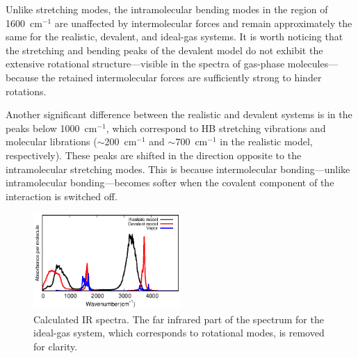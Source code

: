 \documentclass[journal=jacsat,manuscript=article]{achemso}
\begin{document}

Unlike stretching modes, the intramolecular bending modes in the region of 1600~cm$^{-1}$ are unaffected by intermolecular forces and remain approximately the same for the realistic, devalent, and ideal-gas systems. 
It is worth noticing that the stretching and bending peaks of the devalent model do not exhibit the extensive rotational structure---visible in the spectra of gas-phase molecules---because the retained intermolecular forces are sufficiently strong to hinder rotations.

Another significant difference between the realistic and devalent systems is in the peaks below 1000~cm$^{-1}$, which correspond to HB stretching vibrations and molecular librations ($\sim$200~cm$^{-1}$ and $\sim$700~cm$^{-1}$ in the realistic model, respectively). These peaks are shifted in the direction opposite to the intramolecular stretching modes. This is because intermolecular bonding---unlike intramolecular bonding---becomes softer when the covalent component of the interaction is switched off.%

\begin{figure}
\centering
\includegraphics[width=0.5\textwidth]{new_ir}
\caption{Calculated IR spectra. The far infrared part of the spectrum for the ideal-gas system, which corresponds to rotational modes, is removed for clarity. 
} \label{Fig:IR}
\end{figure}
\end{document}
